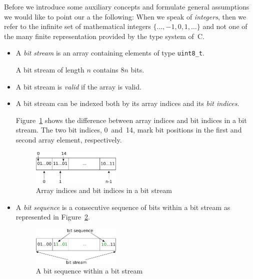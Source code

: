 Before we introduce some auxiliary concepts and formulate general assumptions
we would like to point our a the following: 
When we speak of \emph{integers}, then we refer to the infinite set of mathematical
integers $\{\ldots, -1, 0, 1, \ldots\}$
and not one of the many finite representation provided by the type system of~C.

\begin{itemize}
\item
A \emph{bit stream} is an array containing elements of type \verb"uint8_t".

A bit stream of length $n$ contains $8n$ bits.

\item
A bit stream is \emph{valid} if the array is valid.

\item 
A bit stream can be indexed both by its array indices
and its \emph{bit indices}.

Figure~\ref{fig:bitstream-indices} shows the difference between 
array indices and bit indices in a bit stream.
The two bit indices, 0~and~14,
mark bit positions in the first and second array element, respectively.

\begin{figure}[hbt]
\begin{center}
\includegraphics[width=0.40\textwidth]{figures/array_as_stream.pdf}
\caption{\label{fig:bitstream-indices} Array indices and bit indices in a bit stream}
\end{center}
\end{figure}


\item
A \emph{bit sequence} is a consecutive sequence of bits within a bit stream
as represented in Figure~\ref{fig:bitsequence}.
\begin{figure}[hbt]
\begin{center}
\includegraphics[width=0.40\textwidth]{figures/bit_sequence.pdf}
\caption{\label{fig:bitsequence} A bit sequence within a bit stream}
\end{center}
\end{figure}


\end{itemize}
